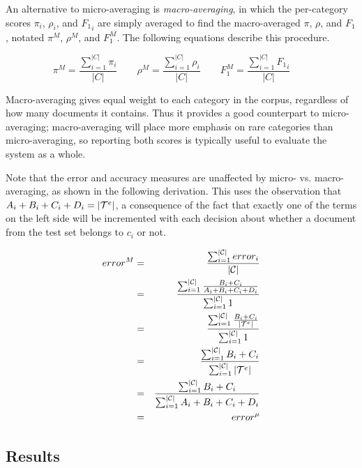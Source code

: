 An alternative to micro-averaging is \emph{macro-averaging}, in which
the per-category scores $\pi_i$, $\rho_i$, and ${F_1}_i$ are simply
averaged to find the macro-averaged $\pi$, $\rho$, and $F_1$, notated
$\pi^M$, $\rho^M$, and $F^M_1$.  The following equations describe this
procedure.

\begin{displaymath}
 \pi^M = \frac{\sum_{i=1}^{|C|}{\pi_i}}   {|C|} \qquad
\rho^M = \frac{\sum_{i=1}^{|C|}{\rho_i}}  {|C|} \qquad
 F^M_1 = \frac{\sum_{i=1}^{|C|}{{F_1}_i}} {|C|} \qquad
\end{displaymath}

Macro-averaging gives equal weight to each category in the corpus,
regardless of how many documents it contains.  Thus it provides a
good counterpart to micro-averaging; macro-averaging will place more
emphasis on rare categories than micro-averaging, so reporting both
scores is typically useful to evaluate the system as a whole.

Note that the error and accuracy measures are unaffected by micro-
vs. macro-averaging, as shown in the following derivation.  This uses
the observation that $A_i+B_i+C_i+D_i = |\mathcal{T}^e|$, a consequence of the
fact that exactly one of the terms on the left side will be
incremented with each decision about whether a document from the test
set belongs to $c_i$ or not.

\begin{eqnarray*}
error^M
 & = & \frac{\sum_{i=1}^{|\mathcal{C}|}{error_i}}  {|\mathcal{C}|} \\
 & = & \frac{\sum_{i=1}^{|\mathcal{C}|}{ \frac{B_i+C_i}{A_i+B_i+C_i+D_i} }} { \sum_{i=1}^{|\mathcal{C}|}{1} } \\
 & = & \frac{\sum_{i=1}^{|\mathcal{C}|}{ \frac{B_i+C_i}{|\mathcal{T}^e|} }}         { \sum_{i=1}^{|\mathcal{C}|}{1} } \\
 & = & \frac{\sum_{i=1}^{|\mathcal{C}|}{B_i+C_i}}                           { \sum_{i=1}^{|\mathcal{C}|}{|\mathcal{T}^e|} } \\
 & = & \frac{\sum_{i=1}^{|\mathcal{C}|}{B_i+C_i}}                           { \sum_{i=1}^{|\mathcal{C}|}{A_i+B_i+C_i+D_i} } \\
 & = & error^\mu
\end{eqnarray*}


\subsection{Results}

